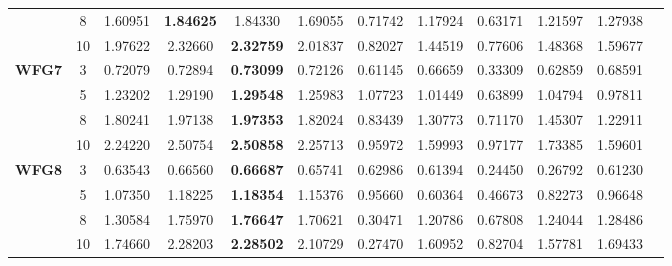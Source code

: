 \documentclass{sig-alternate}
\begin{document}
\begin{table*}[!htb]
\begin{tabular}{|c|c|c|c|c|c|c|c|c|c|c|c|}
& 8          & 1.60951          & \textbf{1.84625}  & 1.84330               & 1.69055          & 0.71742             & 1.17924             & 0.63171            & 1.21597              & 1.27938          \\ \cline{2-11} 
& 10         & 1.97622          & 2.32660           & \textbf{2.32759}      & 2.01837          & 0.82027             & 1.44519             & 0.77606            & 1.48368              & 1.59677          \\ \hline
\multirow{4}{*}{\textbf{WFG7}}  & 3          & 0.72079          & 0.72894           & \textbf{0.73099}      & 0.72126          & 0.61145             & 0.66659             & 0.33309            & 0.62859              & 0.68591          \\ \cline{2-11} 
& 5          & 1.23202          & 1.29190           & \textbf{1.29548}      & 1.25983          & 1.07723             & 1.01449             & 0.63899            & 1.04794              & 0.97811          \\ \cline{2-11} 
& 8          & 1.80241          & 1.97138           & \textbf{1.97353}      & 1.82024          & 0.83439             & 1.30773             & 0.71170            & 1.45307              & 1.22911          \\ \cline{2-11} 
& 10         & 2.24220          & 2.50754           & \textbf{2.50858}      & 2.25713          & 0.95972             & 1.59993             & 0.97177            & 1.73385              & 1.59601          \\ \hline
\multirow{4}{*}{\textbf{WFG8}}  & 3          & 0.63543          & 0.66560           & \textbf{0.66687}      & 0.65741          & 0.62986             & 0.61394             & 0.24450            & 0.26792              & 0.61230          \\ \cline{2-11} 
& 5          & 1.07350          & 1.18225           & \textbf{1.18354}      & 1.15376          & 0.95660             & 0.60364             & 0.46673            & 0.82273              & 0.96648          \\ \cline{2-11} 
& 8          & 1.30584          & 1.75970           & \textbf{1.76647}      & 1.70621          & 0.30471             & 1.20786             & 0.67808            & 1.24044              & 1.28486          \\ \cline{2-11} 
& 10         & 1.74660          & 2.28203           & \textbf{2.28502}      & 2.10729          & 0.27470             & 1.60952             & 0.82704            & 1.57781              & 1.69433          \\ \hline

\end{tabular}
\end{table*}
\end{document}
